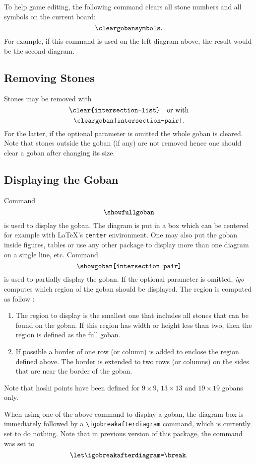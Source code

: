 \documentclass[fleqn]{article}
\begin{document}
To help game editing, the following command clears all stone numbers and all symbols on the current board: \[\verb|\cleargobansymbols|.\] For example, if this command is used on the left diagram above, the result would be the second diagram.

\subsection{Removing Stones}

Stones may be removed with \[\verb|\clear{intersection-list}| \quad\text{or with}\] \[\verb|\cleargoban[intersection-pair]|.\] For the latter, if the optional parameter is omitted the whole goban is cleared. Note that stones outside the goban (if any) are not removed hence one should clear a goban after changing its size.

\subsection{Displaying the Goban}

Command \[\verb|\showfullgoban|\] is used to display the goban. The diagram is put in a box which can be centered for example with \LaTeX's \verb|center| environment. One may also put the goban inside figures, tables or use any other package to display more than one diagram on a single line, etc. Command \[\verb|\showgoban[intersection-pair]|\] is used to partially display the goban. If the optional parameter is omitted, \textit{igo} computes which region of the goban should be displayed. The region is computed as follow :
\begin{enumerate}
	\item
		The region to display is the smallest one that includes all stones that can be found on the goban. If this region has width or height less than two, then the region is defined as the full goban. 
	\item
		If possible a border of one row (or column) is added to enclose the region defined above. The border is extended to two rows (or columns) on the sides that are near the border of the goban.
\end{enumerate}
Note that hoshi points have been defined for $9 \times 9$, $13 \times 13$ and $19 \times 19$ gobans only.

When using one of the above command to display a goban, the diagram box is immediately followed by a \verb|\igobreakafterdiagram| command, which is currently set to do nothing. Note that in previous version of this package, the command was set to \[\verb|\let\igobreakafterdiagram=\break|.\]
\end{document}
